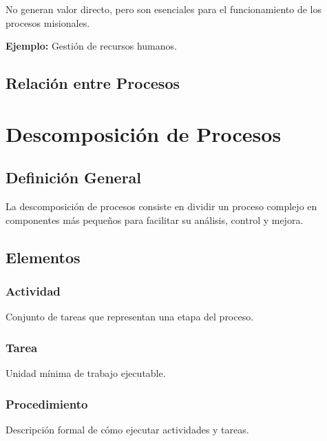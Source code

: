 \documentclass[12pt,a4paper]{article}
\begin{document}
No generan valor directo, pero son esenciales para el funcionamiento de los procesos misionales.

\textbf{Ejemplo:} Gestión de recursos humanos.

\subsection{Relación entre Procesos}

\begin{center}
\end{center}

\section{Descomposición de Procesos}

\subsection{Definición General}

La descomposición de procesos consiste en dividir un proceso complejo en componentes más pequeños para facilitar su análisis, control y mejora.

\subsection{Elementos}

\subsubsection{Actividad}
Conjunto de tareas que representan una etapa del proceso.

\subsubsection{Tarea}
Unidad mínima de trabajo ejecutable.

\subsubsection{Procedimiento}
Descripción formal de cómo ejecutar actividades y tareas.
\end{document}
